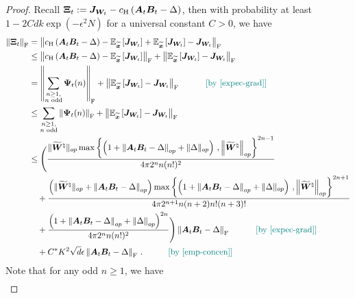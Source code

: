 \begin{proof}
Recall $\bm \Xi_t := \bm J_{\bm W_t} - c_{\rm H}\left(\bm A_t \bm B_t - \Delta\right)$, then with probability at least $1-2Cdk\operatorname{exp}\left(-\epsilon^2N\right)$ for a universal constant $C>0$, we have
\begin{align*}
    \left\|\bm \Xi_t\right\|_{\rm F} & = \left\|c_{\rm H}\left(\bm A_t \bm B_t - \Delta\right)-\mathbb{E}_{\widetilde{\bm x}}\left[\bm J_{\bm W_t}\right]+\mathbb{E}_{\widetilde{\bm x}}\left[\bm J_{\bm W_t}\right]-\bm J_{\bm W_t}\right\|_{\rm F}\\
    & \leq \left\|c_{\rm H}\left(\bm A_t \bm B_t - \Delta\right)-\mathbb{E}_{\widetilde{\bm x}}\left[\bm J_{\bm W_t}\right]\right\|_{\rm F}+\left\|\mathbb{E}_{\widetilde{\bm x}}\left[\bm J_{\bm W_t}\right]-\bm J_{\bm W_t}\right\|_{\rm F}\\
    & = \left\|\sum_{\substack{n\geq 1,\\n\text{ odd}}}\bm \Psi_t(n)\right\|_{\rm F} +\left\|\mathbb{E}_{\widetilde{\bm x}}\left[\bm J_{\bm W_t}\right]-\bm J_{\bm W_t}\right\|_{\rm F}\quad \tag*{\color{teal}[by \cref{expec-grad}]}\\
    & \leq \sum_{\substack{n\geq 1,\\n\text{ odd}}}\left\|\bm \Psi_t(n)\right\|_{\rm F} +\left\|\mathbb{E}_{\widetilde{\bm x}}\left[\bm J_{\bm W_t}\right]-\bm J_{\bm W_t}\right\|_{\rm F}\\
    & \leq \Bigg(\frac{\|\widetilde{\bm W}^\natural\|_{op}\max\left\{\left(1 + \left\|\bm A_t \bm B_t - \Delta\right\|_{op} + \|\Delta\|_{op}\right)\,,\left\|\widetilde{\bm W}^\natural\right\|_{op}\right\}^{2n-1}}{4\pi 2^{n} n (n!)^2}\\
    & \quad +\frac{\left(\|\widetilde{\bm W}^\natural\|_{op}+\left\|\bm A_{t}\bm B_t - \Delta\right\|_{op}\right)\max\left\{\left(1 + \left\|\bm A_t \bm B_t - \Delta\right\|_{op} + \|\Delta\|_{op}\right)\,,\left\|\widetilde{\bm W}^\natural\right\|_{op}\right\}^{2n+1}}{4\pi2^{n+1} n(n + 2)n!(n+3)!}\\
    & \quad + \frac{\left(1+\left\|\bm A_{t}\bm B_t - \Delta\right\|_{op}+\left\|\Delta\right\|_{op}\right)^{2n}}{4\pi 2^{n} n (n!)^2}\Bigg)\left\|\bm A_t \bm B_t - \Delta\right\|_{\rm F}\quad \tag*{\color{teal}[by \cref{expec-grad}]}\\
    &\quad + C^* K^2 \sqrt{d} \epsilon \left\|\bm A_t \bm B_t - \Delta\right\|_{\rm F}\,. \quad \tag*{\color{teal}[by \cref{emp-concen}]}
\end{align*}
Note that for any odd $n \geq 1$, we have
\begin{align*}

\end{align*}
\end{proof}
